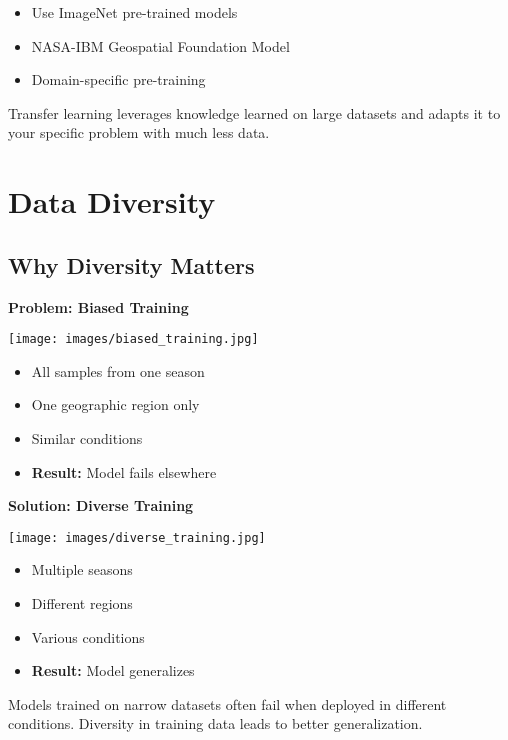 \documentclass[
  letterpaper,
  DIV=11,
  numbers=noendperiod]{scrartcl}
\providecommand{\tightlist}{%
  \setlength{\itemsep}{0pt}\setlength{\parskip}{0pt}}
\begin{document}
\begin{itemize}
\tightlist
\item
  Use ImageNet pre-trained models
\item
  NASA-IBM Geospatial Foundation Model
\item
  Domain-specific pre-training
\end{itemize}

Transfer learning leverages knowledge learned on large datasets and
adapts it to your specific problem with much less data.

\section{Data Diversity}\label{data-diversity}

\subsection{Why Diversity Matters}\label{why-diversity-matters}

\textbf{Problem: Biased Training}

\texttt{[image: images/biased\_training.jpg]}

\begin{itemize}
\tightlist
\item
  All samples from one season
\item
  One geographic region only
\item
  Similar conditions
\item
  \textbf{Result:} Model fails elsewhere
\end{itemize}

\textbf{Solution: Diverse Training}

\texttt{[image: images/diverse\_training.jpg]}

\begin{itemize}
\tightlist
\item
  Multiple seasons
\item
  Different regions
\item
  Various conditions
\item
  \textbf{Result:} Model generalizes
\end{itemize}

Models trained on narrow datasets often fail when deployed in different
conditions. Diversity in training data leads to better generalization.
\end{document}
